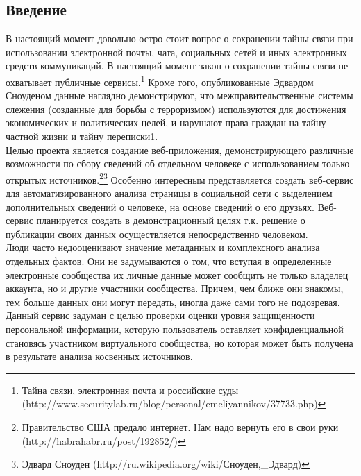 
\begin{chap1}
\newpage
\section{Введение}
В настоящий момент довольно остро стоит вопрос о сохранении тайны связи при использовании электронной почты, чата, социальных сетей и иных электронных средств коммуникаций. В настоящий момент  закон о сохранении тайны связи не охватывает публичные сервисы.\footnote{ Тайна связи, электронная почта и российские суды (http://www.securitylab.ru/blog/personal/emeliyannikov/37733.php)}
Кроме того, опубликованные Эдвардом Сноуденом данные наглядно демонстрируют, что межправительственные системы слежения (созданные для борьбы с терроризмом) используются для достижения экономических и политических целей, и нарушают права граждан на тайну частной жизни и тайну переписки1.\\

Целью проекта является создание веб-приложения, демонстрирующего различные возможности по сбору сведений об отдельном человеке с использованием только открытых источников.\footnote{Правительство США предало интернет. Нам надо вернуть его в свои руки     (http://habrahabr.ru/post/192852/)}\footnote{Эдвард Сноуден (http://ru.wikipedia.org/wiki/Сноуден,\_Эдвард)} 
Особенно интересным представляется создать веб-сервис для автоматизированного анализа страницы в социальной сети с выделением дополнительных сведений о человеке, на основе сведений о его друзьях. Веб-сервис планируется создать в демонстрационный целях т.к. решение о публикации своих данных осуществляется непосредственно человеком.\\

Люди часто недооценивают значение метаданных и комплексного анализа отдельных фактов. Они не задумываются о том, что вступая в определенные электронные сообщества их личные данные может сообщить не только владелец аккаунта, но и другие участники сообщества. Причем, чем ближе они знакомы, тем больше данных они могут передать, иногда даже сами того не подозревая.\\

Данный сервис задуман с целью проверки оценки уровня защищенности персональной информации, которую пользователь оставляет конфиденциальной становясь участником виртуального сообщества, но которая может быть получена в результате анализа косвенных источников. \\


\end{chap1}
